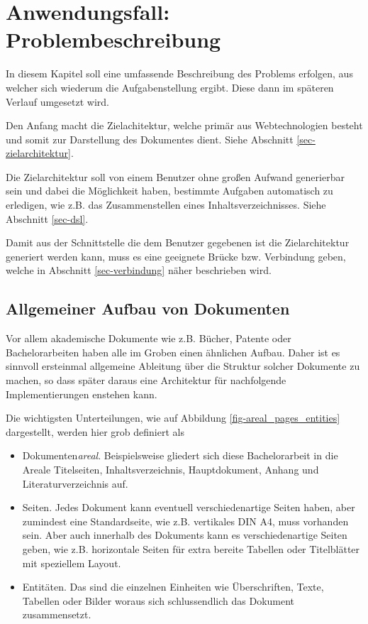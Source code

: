 \chapter{Anwendungsfall: Problembeschreibung}

In diesem Kapitel soll eine umfassende Beschreibung des Problems erfolgen,
aus welcher sich wiederum die Aufgabenstellung ergibt. Diese dann im
späteren Verlauf umgesetzt wird.

Den Anfang macht die Zielachitektur, welche primär aus Webtechnologien
besteht und somit zur Darstellung des Dokumentes dient. Siehe
Abschnitt \ref{sec-zielarchitektur}.

Die Zielarchitektur soll von einem Benutzer ohne großen Aufwand
generierbar sein und dabei die Möglichkeit haben, bestimmte
Aufgaben automatisch zu erledigen, wie z.B. das Zusammenstellen
eines Inhaltsverzeichnisses. Siehe Abschnitt \ref{sec-dsl}.

Damit aus der Schnittstelle die dem Benutzer gegebenen ist die Zielarchitektur
generiert werden kann, muss es eine geeignete Brücke bzw. Verbindung
geben, welche in Abschnitt \ref{sec-verbindung} näher beschrieben wird.

\section{Allgemeiner Aufbau von Dokumenten}

Vor allem akademische Dokumente wie z.B. Bücher, Patente oder Bachelorarbeiten
haben alle im Groben einen ähnlichen Aufbau. Daher ist es sinnvoll ersteinmal
allgemeine Ableitung über die Struktur solcher Dokumente zu machen, so dass
später daraus eine Architektur für nachfolgende Implementierungen enstehen kann.

Die wichtigsten Unterteilungen,
  wie auf Abbildung \ref{fig-areal_pages_entities} dargestellt,
werden hier grob definiert als

\begin{itemize}
  \item Dokumenten\emph{areal}.
        Beispielsweise gliedert sich diese Bachelorarbeit in die
        Areale Titelseiten, Inhaltsverzeichnis, Hauptdokument, Anhang und
        Literaturverzeichnis auf.
  \item Seiten.
        Jedes Dokument kann eventuell verschiedenartige Seiten haben, aber zumindest
        eine Standardseite, wie z.B. vertikales DIN A4, muss vorhanden sein.
        Aber auch innerhalb des Dokuments kann es verschiedenartige Seiten
        geben, wie z.B. horizontale Seiten für extra bereite Tabellen oder
        Titelblätter mit speziellem Layout.
  \item Entitäten.
        Das sind die einzelnen Einheiten wie Überschriften, Texte, Tabellen
        oder Bilder woraus sich schlussendlich das Dokument zusammensetzt.
\end{itemize}

